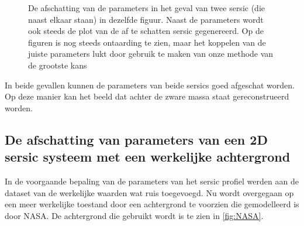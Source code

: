 \begin{figure}
\begin{minipage}{0.98\linewidth}
    \end{minipage}
    \caption{De afschatting van de parameters in het geval van twee sersic (die naast elkaar staan) in dezelfde figuur. Naast de parameters wordt ook steeds de plot van de af te schatten sersic gegenereerd. Op de figuren is nog steeds ontaarding te zien, maar het koppelen van de juiste parameters lukt door gebruik te maken van onze methode van de grootste kans}
    \label{fig: 2 sersic naast zwaar}
\end{figure}
In beide gevallen kunnen de parameters van beide sersics goed afgeschat worden. Op deze manier kan het beeld dat achter de zware massa staat gereconstrueerd worden.

\subsection{De afschatting van parameters van een 2D sersic systeem met een werkelijke achtergrond}
In de voorgaande bepaling van de parameters van het sersic profiel werden aan de dataset van de werkelijke waarden wat ruis toegevoegd. Nu wordt overgegaan op een meer werkelijke toestand door een achtergrond te voorzien die gemodelleerd is door NASA. De achtergrond die gebruikt wordt is te zien in \cref{fig:NASA}.
